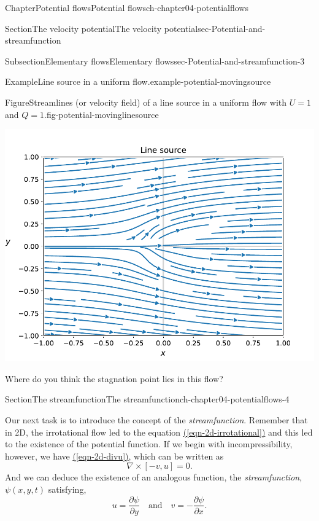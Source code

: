\documentclass[oneside,10pt,]{book}
\newcommand{\xreffont}{\relax}
\numberwithin{equation}{section}
\newcommand{\pd}[2]{\frac{\partial#1}{\partial#2}}
\begin{document}
\begin{chapterptx}{Chapter}{Potential flows}{}{Potential flows}{}{}{ch-chapter04-potentialflows}
\begin{sectionptx}{Section}{The velocity potential}{}{The velocity potential}{}{}{sec-Potential-and-streamfunction}
\begin{subsectionptx}{Subsection}{Elementary flows}{}{Elementary flows}{}{}{sec-Potential-and-streamfunction-3}
\begin{example}{Example}{Line source in a uniform flow.}{example-potential-movingsource}
\begin{figureptx}{Figure}{Streamlines (or velocity field) of a line source in a uniform flow with \(U = 1\) and \(Q = 1\).}{fig-potential-movinglinesource}{}
\begin{image}{0.05}{0.9}{0.05}{}
\includegraphics[width=\linewidth]{external/movinglinesource.pdf}
\end{image}%
\tcblower
\end{figureptx}%
Where do you think the stagnation point lies in this flow?%
\end{example}
\end{subsectionptx}
\end{sectionptx}
%
%
\typeout{************************************************}
\typeout{************************************************}
%
\begin{sectionptx}{Section}{The streamfunction}{}{The streamfunction}{}{}{ch-chapter04-potentialflows-4}
\begin{introduction}{}%
Our next task is to introduce the concept of the \emph{streamfunction}. Remember that in 2D, the irrotational flow led to the equation \hyperref[eqn-2d-irrotational]{({\xreffont\ref{eqn-2d-irrotational}})} and this led to the existence of the potential function. If we begin with incompressibility, however, we have \hyperref[eqn-2d-divu]{({\xreffont\ref{eqn-2d-divu}})}, which can be written as%
\begin{equation}
\nabla \times [-v, u] = 0.\label{eqn-1d-divu-cross}
\end{equation}
And we can deduce the existence of an analogous function, the \emph{streamfunction}, \(\psi(x, y, t)\) satisfying,%
\begin{equation}
u = \pd{\psi}{y} \quad \textrm{and} \quad v = -\pd{\psi}{x}.\label{eqn-2d-uv-streamfunction}
\end{equation}

\end{introduction}
\end{sectionptx}
\end{chapterptx}
\end{document}
